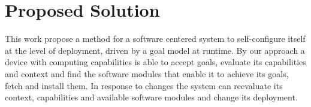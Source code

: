 \section{Proposed Solution}

This work propose a method for a software centered system to self-configure itself at the level of deployment, driven by a goal model at runtime.
By our approach a device with computing capabilities is able to accept goals, evaluate its capabilities and context and find the software modules that enable it to achieve its goals, fetch and install them.
In response to changes the system can reevaluate its context, capabilities and available software modules and change its deployment.
